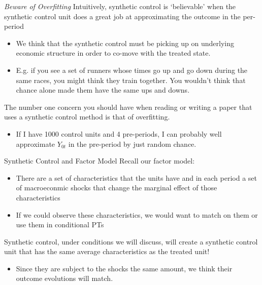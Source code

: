 \documentclass[t]{beamer}
\begin{document}




\begin{frame}{\emph{Beware of Overfitting}}
  Intuitively, synthetic control is `believable' when the synthetic control unit does a great job at approximating the outcome in the per-period
  \begin{itemize}
    \item We think that the synthetic control must be picking up on underlying economic structure in order to co-move with the treated state.
    \item E.g. if you see a set of runners whose times go up and go down during the same races, you might think they train together. You wouldn't think that chance alone made them have the same ups and downs.
  \end{itemize}
  
  \pause
  \bigskip
  The number one concern you should have when reading or writing a paper that uses a synthetic control method is that of overfitting. 
  \begin{itemize}
    \item If I have 1000 control units and 4 pre-periods, I can probably well approximate $Y_{0t}$ in the pre-period by just random chance. 
  \end{itemize}
\end{frame}

\begin{frame}{Synthetic Control and Factor Model}
  Recall our factor model:
  \begin{itemize}
    \item There are a set of characteristics that the units have and in each period a set of macroeconmic shocks that change the marginal effect of those characteristics
    \item If we could observe these characteristics, we would want to match on them or use them in conditional PTs
  \end{itemize}

  \pause
  \bigskip
  Synthetic control, under conditions we will discuss, will create a synthetic control unit that has the same average characteristics as the treated unit! 
  \begin{itemize}
    \item Since they are subject to the shocks the same amount, we think their outcome evolutions will match.
  \end{itemize}
\end{frame}
\end{document}
